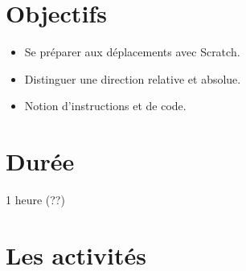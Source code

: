 \documentclass[class=report,crop=false, 12pt]{standalone}
\begin{document}



\section*{Objectifs}

\begin{itemize}
  \item Se préparer aux déplacements avec Scratch.
  \item Distinguer une direction relative et absolue.
  \item Notion d'instructions et de code.
\end{itemize}


\section*{Durée}

1 heure (??)

\section*{Les activités}
\end{document}
